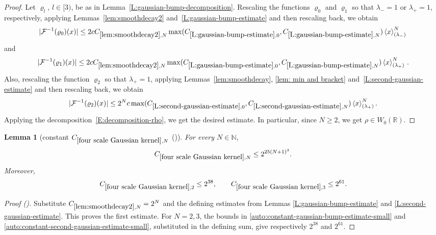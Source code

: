 \documentclass[12pt,reqno]{amsart}
\newcommand{\auto}{{({\tiny\faCar})}}
\theoremstyle{plain}
\newtheorem{lemma}[theorem]{Lemma}
\numberwithin{equation}{section}
\theoremstyle{remark}
\newcommand{\using}[1]{}
\newcommand{\R}{{\mathbb R}}
\newcommand{\N}{{\mathbb N}}
\begin{document}
\begin{proof}
Let $\varrho_l$, $l\in [3)$, be as in Lemma~\ref{L:gaussian-bump-decomposition}.
Rescaling the functions $\varrho_0$ and $\varrho_1$ so that $\lambda_{-}=1$ or $\lambda_{+}=1$, respectively, applying Lemmas~\ref{lem:smoothdecay2} and~\ref{L:gaussian-bump-estimate} and then rescaling back, we obtain
\begin{equation*}
     |\mathcal{F}^{-1}(\varrho_0)(x)|\le 2cC_{\ref{lem:smoothdecay2},N}\max(C_{\ref{L:gaussian-bump-estimate},0},C_{\ref{L:gaussian-bump-estimate},N}) \left<x\right>_{(\lambda_{-})}^N\,
\end{equation*}
and
\begin{equation*}
     |\mathcal{F}^{-1}(\varrho_1)(x)|\le 2cC_{\ref{lem:smoothdecay2},N}\max(C_{\ref{L:gaussian-bump-estimate},0},C_{\ref{L:gaussian-bump-estimate},N}) \left<x\right>_{(\lambda_{+})}^N\,.
\end{equation*}
Also, rescaling the function $\varrho_2$ so that $\lambda_{+}=1$, applying Lemmas~\ref{lem:smoothdecay}, \ref{lem: min and bracket} and~\ref{L:second-gaussian-estimate} and then rescaling back, we obtain
\begin{equation*}
     |\mathcal{F}^{-1}(\varrho_2)(x)|\le 2^Nc\max(C_{\ref{L:second-gaussian-estimate},0},C_{\ref{L:second-gaussian-estimate},N}) \left<x\right>_{(\lambda_{+})}^N.
\end{equation*}
Applying the decomposition~\eqref{E:decomposition-rho}, we get the desired estimate. In particular, since $N\geq 2$, we get $\rho \in W_0(\R)$.
\end{proof}

\begin{lemma}[constant $C_{\ref{four scale Gaussian kernel},N}$ \auto]\label{constant four scale Gaussian kernel}\using{lem:smoothdecay2}\using{L:gaussian-bump-estimate}\using{L:second-gaussian-estimate}\using{constant gaussian bump estimate}\using{constant second gaussian estimate}
For every $N\in\N$,
\begin{equation}\label{constant four scale Gaussian kernel bound}
C_{\ref{four scale Gaussian kernel},N}\le2^{25(N+1)^3}.
\end{equation}
Moreover,
\begin{equation}\label{auto:constant-four-scale-Gaussian-kernel-small}
C_{\ref{four scale Gaussian kernel},2}\le2^{38},
\qquad
C_{\ref{four scale Gaussian kernel},3}\le2^{61}.
\end{equation}
\end{lemma}
\begin{proof}[Proof \auto]
Substitute $C_{\ref{lem:smoothdecay2},N}=2^N$ and the defining estimates from Lemmas \ref{L:gaussian-bump-estimate} and \ref{L:second-gaussian-estimate}. This proves the first estimate. For $N=2,3$, the bounds in \eqref{auto:constant-gaussian-bump-estimate-small} and \eqref{auto:constant-second-gaussian-estimate-small}, substituted in the defining sum, give respectively $2^{38}$ and $2^{61}$.
\end{proof}
\end{document}
